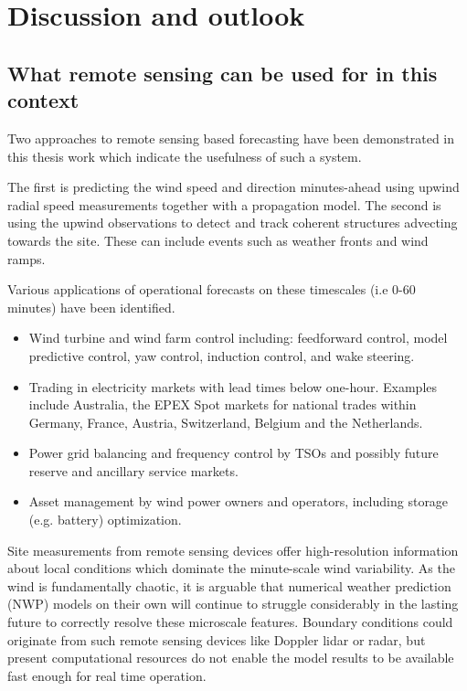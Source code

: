 \chapter{Discussion and outlook}
\label{sec:discussion}

\clearpage
\section{What remote sensing can be used for in this context}
\label{sec:discussion_rs}
\bigskip

Two approaches to remote sensing based forecasting have been demonstrated in this thesis work which indicate the usefulness of such a system.

The first is predicting the wind speed and direction minutes-ahead using upwind radial speed measurements together with a propagation model. The second is using the upwind observations to detect and track coherent structures advecting towards the site. These can include events such as weather fronts and wind ramps.

Various applications of operational forecasts on these timescales (i.e 0-60 minutes) have been identified.

\begin{itemize}
    \item Wind turbine and wind farm control including: feedforward control, model predictive control, yaw control, induction control, and wake steering.
    \item Trading in electricity markets with lead times below one-hour. Examples include Australia, the EPEX Spot markets for national trades within Germany, France, Austria, Switzerland, Belgium and the Netherlands.
    \item Power grid balancing and frequency control by TSOs and possibly future reserve and ancillary service markets.
    \item Asset management by wind power owners and operators, including storage (e.g. battery) optimization.
\end{itemize}

Site measurements from remote sensing devices offer high-resolution information about local conditions which dominate the minute-scale wind variability. As the wind is fundamentally chaotic, it is arguable that numerical weather prediction (NWP) models on their own will continue to struggle considerably in the lasting future to correctly resolve these microscale features. Boundary conditions could originate from such remote sensing devices like Doppler lidar or radar, but present computational resources do not enable the model results to be available fast enough for real time operation.

